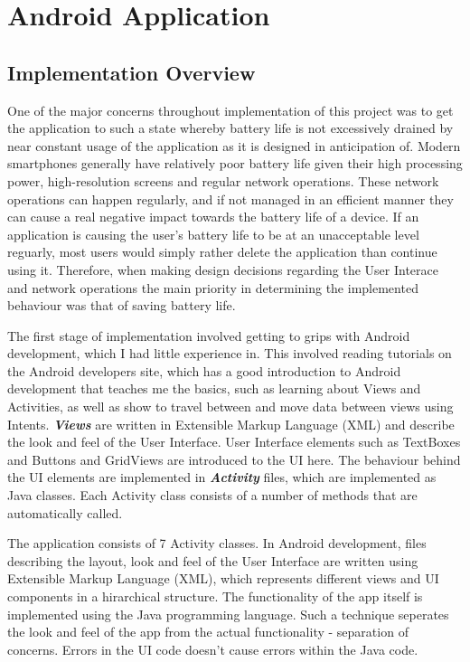 \documentclass{l4proj}
\begin{document}
\section{Android Application}

\subsection{Implementation Overview}

One of the major concerns throughout implementation of this project was to get the application to such a state whereby battery life is not excessively drained by  near constant usage of the application as it is designed in anticipation of. Modern smartphones generally have relatively poor battery life given their high processing power, high-resolution screens and regular network operations. These network operations can happen regularly, and if not managed in an efficient manner  they can cause a real negative impact towards the battery life of a device. If an application is causing the user's battery life to be at an unacceptable level reguarly, most users would simply rather delete the application than continue using it. Therefore, when making design decisions regarding the User Interace and network operations the main priority in determining the implemented behaviour was that of saving battery life.

The first stage of implementation involved getting to grips with Android development, which I had little experience in. This involved reading tutorials on the Android developers site, which has a good introduction to Android development that teaches me the basics, such as learning about Views and Activities, as well as show to travel between and move data between views using Intents. \textbf{\textit{Views}} are written in Extensible Markup Language (XML) and describe the look and feel of the User Interface. User Interface elements such as TextBoxes and Buttons and GridViews are introduced to the UI here. The behaviour behind the UI elements are implemented in \textbf{\textit{Activity}} files, which are implemented as Java classes. Each Activity class consists of a number of methods that are automatically called.

The application consists of 7 Activity classes. In Android development, files describing the layout, look and feel of the User Interface are written using Extensible Markup Language (XML), which represents different views and UI components in a hirarchical structure. The functionality of the app itself is implemented using the Java programming language. Such a technique seperates the look and feel of the app from the actual functionality - separation of concerns. Errors in the UI code doesn't cause errors within the Java code.
\end{document}
